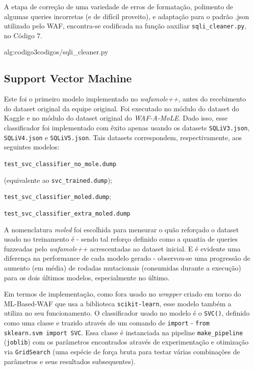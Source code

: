 A etapa de correção de uma variedade de erros de formatação, polimento de algumas queries incorretas (e de difícil proveito), e adaptação para o padrão .json utilizado pelo WAF, encontra-se codificada na função auxiliar \verb+sqli_cleaner.py+, no Código 7.


\label{sec:codigos:sqli_cleaner}
 {alg:codigo3}{codigos/sqli_cleaner.py}
\bigskip


\subsection{Support Vector Machine}
Este foi o primeiro modelo implementado no \textit{wafamole++}, antes do recebimento do dataset original da equipe original. Foi executado no módulo do dataset do Kaggle e no módulo do dataset original do \textit{WAF-A-MoLE}. Dado isso, esse classificador foi implementado com êxito apenas usando os datasets \verb+SQLiV3.json+, \verb+SQLiV4.json+ e \verb+SQLiV5.json+. Tais datasets correspondem, respectivamente, aos seguintes modelos:
\begin{alineas}
\item \verb+test_svc_classifier_no_mole.dump+

(equivalente ao \verb+svc_trained.dump+);
\item \verb+test_svc_classifier_moled.dump+;
\item \verb+test_svc_classifier_extra_moled.dump+ 
\end{alineas}

A nomenclatura \textit{moled} foi escolhida para mensurar o quão reforçado o dataset usado no treinamento é - sendo tal reforço definido como a quantia de queries fuzzeadas pelo \textit{wafamole++} acrescentadas ao dataset inicial. E é evidente uma diferença na performance de cada modelo gerado - observou-se uma progressão de aumento (em média) de rodadas mutacionais (consumidas durante a execução) para os dois últimos modelos, especialmente no último.

Em termos de implementação, como fora usado no \textit{wrapper} criado em torno do ML-Based-WAF que usa a biblioteca \verb+scikit-learn+, esse modelo também a utiliza no seu funcionamento. O classificador usado no modelo é o \verb+SVC()+, definido como uma classe e trazido através de um comando de \verb+import+ - \verb+from sklearn.svm import SVC+. Essa classe é instanciada na pipeline \verb+make_pipeline+ (\verb+joblib+) com os parâmetros encontrados através de experimentação e otimização via \verb+GridSearch+ (uma espécie de força bruta para testar várias combinações de parâmetros e seus resultados subsequentes).

